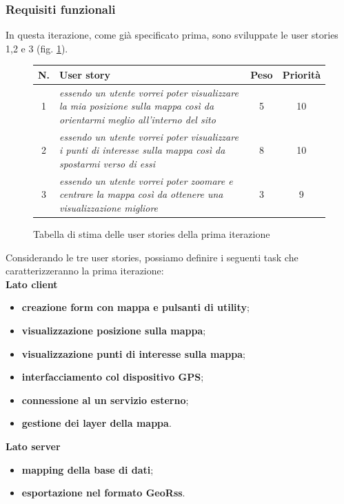 \subsubsection{Requisiti funzionali}
In questa iterazione, come già specificato prima, sono sviluppate le user stories 1,2 e 3 (fig. \ref{userstoriestableprimaiterazione}). \\
\begin{figure}[h!]
\begin{center}
\begin{tabular}[c]{|c|p{7cm}|c|c|}
\hline
N. & User story & Peso & Priorità\\
\hline
1 & \textit{essendo un utente vorrei poter visualizzare la mia posizione sulla mappa così da orientarmi meglio all'interno del sito} & 5 & 10\\
\hline
2 & \textit{essendo un utente vorrei poter visualizzare i punti di interesse sulla mappa così da spostarmi verso di essi} & 8 & 10\\
\hline
3 & \textit{essendo un utente vorrei poter zoomare e centrare la mappa così da ottenere una visualizzazione migliore} & 3 & 9\\
\hline
\end{tabular}
\caption{Tabella di stima delle user stories della prima iterazione\label{userstoriestableprimaiterazione}}
\end{center}
\end{figure}
\clearpage

Considerando le tre user stories, possiamo definire i seguenti task che caratterizzeranno la prima iterazione:\\
\textbf{Lato client}
\begin{itemize}
\item \textbf{creazione form con mappa e pulsanti di utility};
\item \textbf{visualizzazione posizione sulla mappa};
\item \textbf{visualizzazione punti di interesse sulla mappa};
\item \textbf{interfacciamento col dispositivo GPS};
\item \textbf{connessione al un servizio esterno};
\item \textbf{gestione dei layer della mappa}.
\end{itemize}

\textbf{Lato server}
\begin{itemize}
\item \textbf{mapping della base di dati};
\item \textbf{esportazione nel formato GeoRss}.
\end{itemize}

